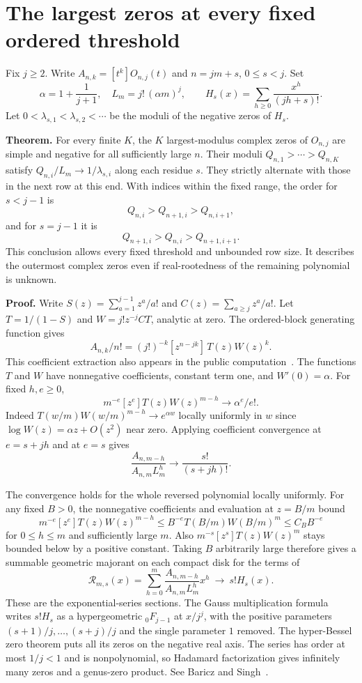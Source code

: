 \documentclass[11pt]{article}
\begin{document}
\section{The largest zeros at every fixed ordered threshold}

Fix $j\ge2$. Write $A_{n,k}=[t^k]O_{n,j}(t)$ and $n=jm+s$, $0\le s<j$. Set
\[
\alpha=1+\frac1{j+1},\quad L_m=j!\,(\alpha m)^j,\qquad
 H_s(x)=\sum_{h\ge0}\frac{x^h}{(jh+s)!}.
\]
Let $0<\lambda_{s,1}<\lambda_{s,2}<\cdots$ be the moduli of the negative zeros of $H_s$.

\textbf{Theorem.} For every finite $K$, the $K$ largest-modulus complex zeros of $O_{n,j}$ are simple and negative for all sufficiently large $n$. Their moduli $Q_{n,1}>\cdots>Q_{n,K}$ satisfy $Q_{n,i}/L_m\to1/\lambda_{s,i}$ along each residue $s$. They strictly alternate with those in the next row at this end. With indices within the fixed range, the order for $s<j-1$ is
\[
Q_{n,i}>Q_{n+1,i}>Q_{n,i+1},
\]
and for $s=j-1$ it is
\[
Q_{n+1,i}>Q_{n,i}>Q_{n+1,i+1}.
\]
This conclusion allows every fixed threshold and unbounded row size. It describes the outermost complex zeros even if real-rootedness of the remaining polynomial is unknown.

\textbf{Proof.} Write $S(z)=\sum_{a=1}^{j-1}z^a/a!$ and $C(z)=\sum_{a\ge j}z^a/a!$. Let $T=1/(1-S)$ and $W=j!z^{-j}C T$, analytic at zero. The ordered-block generating function gives
\[
A_{n,k}/n!=(j!)^{-k}[z^{n-jk}]\,T(z)W(z)^k .
\]
This coefficient extraction also appears in the public computation~\cite{prior}. The functions $T$ and $W$ have nonnegative coefficients, constant term one, and $W'(0)=\alpha$. For fixed $h,e\ge0$,
\[
m^{-e}[z^e]T(z)W(z)^{m-h}\longrightarrow \alpha^e/e!.
\]
Indeed $T(w/m)W(w/m)^{m-h}\to e^{\alpha w}$ locally uniformly in $w$ since $\log W(z)=\alpha z+O(z^2)$ near zero. Applying coefficient convergence at $e=s+jh$ and at $e=s$ gives
\[
\frac{A_{n,m-h}}{A_{n,m}L_m^h}\longrightarrow \frac{s!}{(s+jh)!}.
\]

The convergence holds for the whole reversed polynomial locally uniformly. For any fixed $B>0$, the nonnegative coefficients and evaluation at $z=B/m$ bound
\[
m^{-e}[z^e]T(z)W(z)^{m-h}
 \le B^{-e}T(B/m)W(B/m)^m\le C_B B^{-e}
\]
for $0\le h\le m$ and sufficiently large $m$. Also $m^{-s}[z^s]T(z)W(z)^m$ stays bounded below by a positive constant. Taking $B$ arbitrarily large therefore gives a summable geometric majorant on each compact disk for the terms of
\[
\mathcal R_{m,s}(x)=\sum_{h=0}^m\frac{A_{n,m-h}}{A_{n,m}L_m^h}x^h
 \ \longrightarrow\ s!H_s(x).
\]
These are the exponential-series sections. The Gauss multiplication formula writes $s!H_s$ as a hypergeometric ${}_0F_{j-1}$ at $x/j^j$, with the positive parameters $(s+1)/j,\ldots,(s+j)/j$ and the single parameter $1$ removed. The hyper-Bessel zero theorem puts all its zeros on the negative real axis. The series has order at most $1/j<1$ and is nonpolynomial, so Hadamard factorization gives infinitely many zeros and a genus-zero product. See Baricz and Singh~\cite[Theorem 2]{baricz}.
\end{document}
